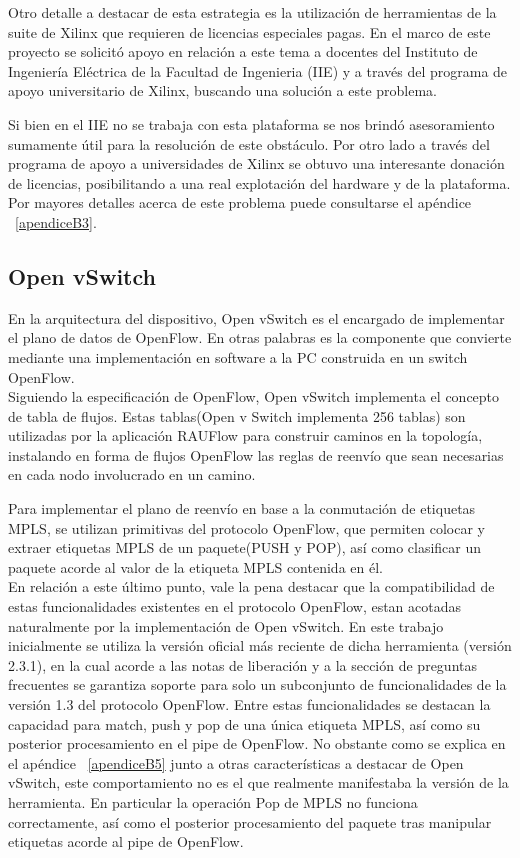 Otro detalle a destacar de esta estrategia es la utilizaci\'on de herramientas de la suite de Xilinx que requieren de licencias especiales pagas. En el marco de este proyecto se solicit\'o apoyo en relaci\'on a este tema a docentes del Instituto de Ingeniería Eléctrica de la Facultad de Ingenieria (IIE) y a través del programa de apoyo universitario de Xilinx, buscando una soluci\'on a este problema.

Si bien en el IIE no se trabaja con esta plataforma se nos brindó asesoramiento sumamente \'util para la resoluci\'on de este obstáculo. Por otro lado a través del programa de apoyo a universidades de Xilinx se obtuvo una interesante donaci\'on de licencias, posibilitando a una real explotaci\'on del hardware y de la plataforma. Por mayores detalles acerca de este problema puede consultarse el apéndice ~\ref{apendiceB3}.

\subsection{Open vSwitch}
En la arquitectura del dispositivo, Open vSwitch es el encargado de implementar el plano de datos de OpenFlow. En otras palabras es la componente que convierte mediante una implementaci\'on en software a la PC construida en un switch OpenFlow.\\

Siguiendo la especificaci\'on de OpenFlow, Open vSwitch implementa el concepto de tabla de flujos. Estas tablas(Open v Switch implementa 256 tablas) son utilizadas por la aplicaci\'on RAUFlow para construir caminos en la topolog\'ia, instalando en forma de flujos OpenFlow las reglas de reenvío que sean necesarias en cada nodo involucrado en un camino.

Para implementar el plano de reenvío en base a la conmutaci\'on de etiquetas MPLS, se utilizan primitivas del protocolo OpenFlow, que permiten colocar y extraer etiquetas MPLS de un paquete(PUSH y POP), así como clasificar un paquete acorde al valor de la etiqueta MPLS contenida en \'el.\\

En relaci\'on a este \'ultimo punto, vale la pena destacar que la compatibilidad de estas funcionalidades existentes en el protocolo OpenFlow, estan acotadas naturalmente  por la implementaci\'on de Open vSwitch. En este trabajo inicialmente se utiliza la versi\'on oficial m\'as reciente de dicha herramienta (versi\'on 2.3.1), en la cual acorde a las notas de liberaci\'on y a la secci\'on de preguntas frecuentes se garantiza soporte para solo un subconjunto de funcionalidades de la versi\'on 1.3 del protocolo OpenFlow. Entre estas funcionalidades se destacan la capacidad para match, push y pop de una \'unica etiqueta MPLS, así como su posterior procesamiento en el pipe de OpenFlow. No obstante como se explica en el apéndice ~\ref{apendiceB5} junto a otras características a destacar de Open vSwitch, este comportamiento no es el que realmente manifestaba la versi\'on de la herramienta. En particular la operación Pop de MPLS no funciona correctamente, así como el posterior procesamiento del paquete tras manipular etiquetas acorde al pipe de OpenFlow.\\ 

